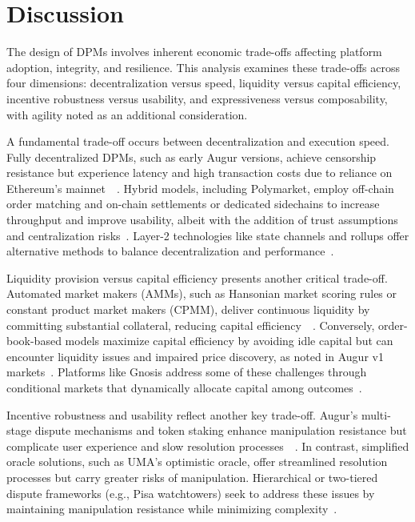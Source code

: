 \section{Discussion}


The design of DPMs involves inherent economic trade-offs affecting platform adoption, integrity, and resilience. This analysis examines these trade-offs across four dimensions: decentralization versus speed, liquidity versus capital efficiency, incentive robustness versus usability, and expressiveness versus composability, with agility noted as an additional consideration.

A fundamental trade-off occurs between decentralization and execution speed. Fully decentralized DPMs, such as early Augur versions, achieve censorship resistance but experience latency and high transaction costs due to reliance on Ethereum’s mainnet~\cite{BCFKMN14}~\cite{AKPWZ15}. Hybrid models, including Polymarket, employ off-chain order matching and on-chain settlements or dedicated sidechains to increase throughput and improve usability, albeit with the addition of trust assumptions and centralization risks~\cite{ClEsGS21}. Layer-2 technologies like state channels and rollups offer alternative methods to balance decentralization and performance~\cite{BBMMM19}.

Liquidity provision versus capital efficiency presents another critical trade-off. Automated market makers (AMMs), such as Hansonian market scoring rules or constant product market makers (CPMM), deliver continuous liquidity by committing substantial collateral, reducing capital efficiency~\cite{Ha03}~\cite{AC20}. Conversely, order-book-based models maximize capital efficiency by avoiding idle capital but can encounter liquidity issues and impaired price discovery, as noted in Augur v1 markets~\cite{AA20}. Platforms like Gnosis address some of these challenges through conditional markets that dynamically allocate capital among outcomes~\cite{Gn17}.

Incentive robustness and usability reflect another key trade-off. Augur’s multi-stage dispute mechanisms and token staking enhance manipulation resistance but complicate user experience and slow resolution processes~\cite{AKPWZ15}~\cite{ClEsGS21}. In contrast, simplified oracle solutions, such as UMA's optimistic oracle, offer streamlined resolution processes but carry greater risks of manipulation. Hierarchical or two-tiered dispute frameworks (e.g., Pisa watchtowers) seek to address these issues by maintaining manipulation resistance while minimizing complexity~\cite{BBMMM19}.

